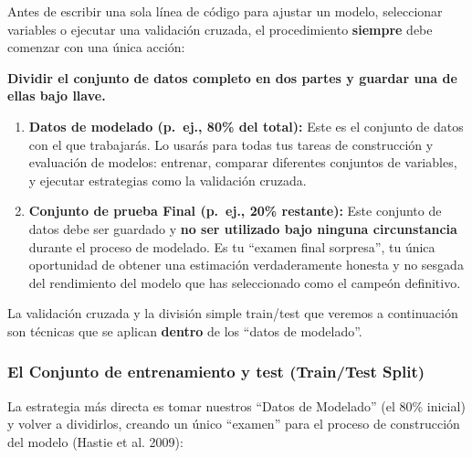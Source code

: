 \documentclass[
  letterpaper,
  DIV=11,
  numbers=noendperiod]{scrreprt}
\providecommand{\tightlist}{%
  \setlength{\itemsep}{0pt}\setlength{\parskip}{0pt}}
\begin{document}
\begin{tcolorbox}[enhanced jigsaw, leftrule=.75mm, breakable, colbacktitle=quarto-callout-warning-color!10!white, bottomrule=.15mm, colframe=quarto-callout-warning-color-frame, toprule=.15mm, colback=white, coltitle=black, bottomtitle=1mm, left=2mm, title=\textcolor{quarto-callout-warning-color}{\faExclamationTriangle}\hspace{0.5em}{El primer paso no negociable: La partición inicial}, opacityback=0, arc=.35mm, opacitybacktitle=0.6, toptitle=1mm, titlerule=0mm, rightrule=.15mm]

Antes de escribir una sola línea de código para ajustar un modelo,
seleccionar variables o ejecutar una validación cruzada, el
procedimiento \textbf{siempre} debe comenzar con una única acción:

\textbf{Dividir el conjunto de datos completo en dos partes y guardar
una de ellas bajo llave.}

\begin{enumerate}
\def\labelenumi{\arabic{enumi}.}
\tightlist
\item
  \textbf{Datos de modelado (p.~ej., 80\% del total):} Este es el
  conjunto de datos con el que trabajarás. Lo usarás para todas tus
  tareas de construcción y evaluación de modelos: entrenar, comparar
  diferentes conjuntos de variables, y ejecutar estrategias como la
  validación cruzada.
\item
  \textbf{Conjunto de prueba Final (p.~ej., 20\% restante):} Este
  conjunto de datos debe ser guardado y \textbf{no ser utilizado bajo
  ninguna circunstancia} durante el proceso de modelado. Es tu ``examen
  final sorpresa'', tu única oportunidad de obtener una estimación
  verdaderamente honesta y no sesgada del rendimiento del modelo que has
  seleccionado como el campeón definitivo.
\end{enumerate}

La validación cruzada y la división simple train/test que veremos a
continuación son técnicas que se aplican \textbf{dentro} de los ``datos
de modelado''.

\end{tcolorbox}

\subsubsection{El Conjunto de entrenamiento y test (Train/Test
Split)}\label{el-conjunto-de-entrenamiento-y-test-traintest-split}

La estrategia más directa es tomar nuestros ``Datos de Modelado'' (el
80\% inicial) y volver a dividirlos, creando un único ``examen'' para el
proceso de construcción del modelo (Hastie et al. 2009):
\end{document}
